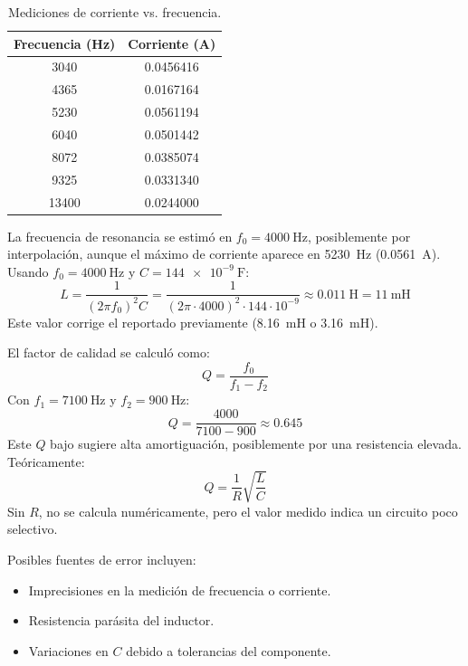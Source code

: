 \documentclass[a4paper,12pt]{article}
\begin{document}
\begin{table}[h]
    \centering
    \begin{tabular}{cc}
        \toprule
        Frecuencia (\si{\hertz}) & Corriente (\si{\ampere}) \\
        \midrule
        3040 & 0.0456416 \\
        4365 & 0.0167164 \\
        5230 & 0.0561194 \\
        6040 & 0.0501442 \\
        8072 & 0.0385074 \\
        9325 & 0.0331340 \\
        13400 & 0.0244000 \\
        \bottomrule
    \end{tabular}
    \caption{Mediciones de corriente vs. frecuencia.}
\end{table}

La frecuencia de resonancia se estimó en \( f_0 = \SI{4000}{\hertz} \), posiblemente por interpolación, aunque el máximo de corriente aparece en \SI{5230}{\hertz} (\SI{0.0561}{\ampere}). Usando \( f_0 = \SI{4000}{\hertz} \) y \( C = \SI{144e-9}{\farad} \):
\[
L = \frac{1}{(2\pi f_0)^2 C} = \frac{1}{(2\pi \cdot 4000)^2 \cdot 144 \cdot 10^{-9}} \approx \SI{0.011}{\henry} = \SI{11}{\milli\henry}
\]
Este valor corrige el reportado previamente (\SI{8.16}{\milli\henry} o \SI{3.16}{\milli\henry}).

El factor de calidad se calculó como:
\[
Q = \frac{f_0}{f_1 - f_2}
\]
Con \( f_1 = \SI{7100}{\hertz} \) y \( f_2 = \SI{900}{\hertz} \):
\[
Q = \frac{4000}{7100 - 900} \approx 0.645
\]
Este \( Q \) bajo sugiere alta amortiguación, posiblemente por una resistencia elevada. Teóricamente:
\[
Q = \frac{1}{R} \sqrt{\frac{L}{C}}
\]
Sin \( R \), no se calcula numéricamente, pero el valor medido indica un circuito poco selectivo.

Posibles fuentes de error incluyen:
\begin{itemize}
    \item Imprecisiones en la medición de frecuencia o corriente.
    \item Resistencia parásita del inductor.
    \item Variaciones en \( C \) debido a tolerancias del componente.
\end{itemize}

\end{document}
